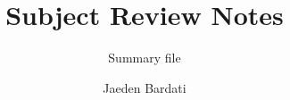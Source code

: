 \documentclass[]{article}
\title{\Huge Subject Review Notes}
\subtitle{Summary file}
\author{Jaeden Bardati}
\date{}
\begin{document}
\maketitle


\TestCustomPackage
\end{document}
